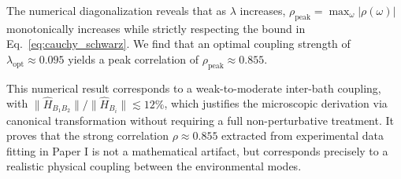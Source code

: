 The numerical diagonalization reveals that as $\lambda$ increases, $\rho_{\text{peak}} = \max_\omega |\rho(\omega)|$ monotonically increases while strictly respecting the bound in Eq.~\eqref{eq:cauchy_schwarz}. We find that an optimal coupling strength of \textbf{$\lambda_{\text{opt}} \approx 0.095$} yields a peak correlation of \textbf{$\rho_{\text{peak}} \approx 0.855$}. 

This numerical result corresponds to a weak-to-moderate inter-bath coupling, with $\|\hat{H}_{B_1B_2}\|/\|\hat{H}_{B_i}\| \lesssim 12\%$, which justifies the microscopic derivation via canonical transformation without requiring a full non-perturbative treatment. It proves that the strong correlation $\rho \approx 0.855$ extracted from experimental data fitting in Paper I is not a mathematical artifact, but corresponds precisely to a realistic physical coupling between the environmental modes.
